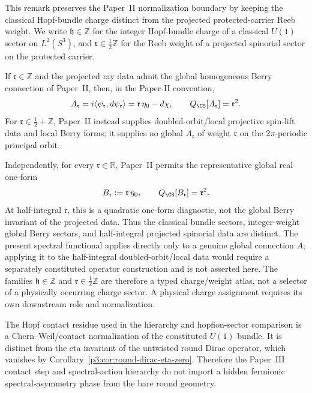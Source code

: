 \documentclass[11pt,a4paper]{article}
\begin{document}
\begin{remark}
This remark preserves the Paper~II normalization boundary by keeping the
classical Hopf-bundle charge distinct from the projected protected-carrier Reeb
weight.  We write \(\mathfrak h\in\mathbb Z\) for the integer Hopf-bundle
charge of a classical \(U(1)\) sector on \(L^2(S^3)\), and
\(\mathfrak r\in\tfrac12\mathbb Z\) for the Reeb weight of a projected
spinorial sector on the protected carrier.

If \(\mathfrak r\in\mathbb Z\) and the projected ray data admit the global
homogeneous Berry connection of Paper~II, then, in the Paper-II convention,
\[
A_{\mathfrak r}
=i\langle \psi_{\mathfrak r},d\psi_{\mathfrak r}\rangle
=\mathfrak r\,\eta_0-d\chi,
\qquad
Q_{\CS}[A_{\mathfrak r}]=\mathfrak r^2.
\]
For \(\mathfrak r\in\tfrac12+\mathbb Z\), Paper~II instead supplies
doubled-orbit/local projective spin-lift data and local Berry forms; it supplies
no global \(A_{\mathfrak r}\) of weight \(\mathfrak r\) on the
\(2\pi\)-periodic principal orbit.

Independently, for every \(\mathfrak r\in\mathbb R\), Paper~II permits the
representative global real one-form
\[
B_{\mathfrak r}:=\mathfrak r\,\eta_0,
\qquad
Q_{\CS}[B_{\mathfrak r}]=\mathfrak r^2.
\]
At half-integral \(\mathfrak r\), this is a quadratic one-form diagnostic, not
the global Berry invariant of the projected data.  Thus the classical bundle
sectors, integer-weight global Berry sectors, and half-integral projected
spinorial data are distinct.  The present spectral functional applies directly
only to a genuine global connection \(A\); applying it to the half-integral
doubled-orbit/local data would require a separately constituted operator
construction and is not asserted here.  The families
\(\mathfrak h\in\mathbb Z\) and
\(\mathfrak r\in\tfrac12\mathbb Z\) are therefore a typed
charge/weight atlas, not a selector of a physically occurring charge sector.
A physical charge assignment requires its own downstream role and
normalization.
\end{remark}

\begin{remark}
\label{p3:rem:hopf-cs-not-dirac-eta}
The Hopf contact residue used in the hierarchy and hopfion-sector comparison is a
Chern--Weil/contact normalization of the constituted \(U(1)\) bundle.  It is distinct
from the eta invariant of the untwisted round Dirac operator, which vanishes by
Corollary~\ref{p3:cor:round-dirac-eta-zero}.  Therefore the Paper~III contact
step and spectral-action hierarchy do not import a hidden fermionic
spectral-asymmetry phase from the bare round geometry.
\end{remark}
\end{document}
